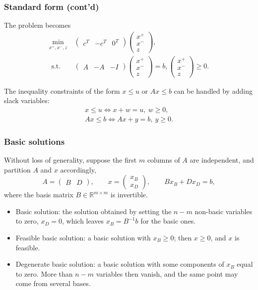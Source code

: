 \documentclass[aspectratio=169]{beamer}
\providecommand{\red}{\color{red}}
\def\RR{\mathbb{R}}
\begin{document}
\begin{frame}
\frametitle{Standard form (cont'd)}

The problem becomes
\begin{align*}
\min_{x^+, x^-, z}\ &
\begin{pmatrix}
c^T & -c^T & 0^T
\end{pmatrix}
\begin{pmatrix}
x^+ \\ x^- \\ z
\end{pmatrix}, \\
\mbox{ s.t. } &
\begin{pmatrix}
A & -A & -I
\end{pmatrix}
\begin{pmatrix}
x^+ \\ x^- \\ z
\end{pmatrix} = b,
\begin{pmatrix}
x^+ \\ x^- \\ z
\end{pmatrix} \geq 0.
\end{align*}

The inequality constraints of the form $x \leq u$ or $Ax \leq b$ can be handled by adding slack variables:
\begin{align*}
x \leq u \Leftrightarrow x+w = u,\ w \geq 0, \\
Ax \leq b \Leftrightarrow Ax + y = b,\ y \geq 0.
\end{align*}

\end{frame}

\begin{frame}
\frametitle{Basic solutions}

Without loss of generality, suppose the first $m$ columns of $A$ are independent, and partition $A$ and $x$ accordingly,
\[
A = \begin{pmatrix} B & D \end{pmatrix}, \qquad x = \begin{pmatrix} x_B \\ x_D \end{pmatrix},
\qquad Bx_B + Dx_D = b,
\]
where the {\red basis matrix} $B \in \RR^{m \times m}$ is invertible.

\begin{itemize}
	\item
	{\red Basic solution}: the solution obtained by setting the $n-m$ {\red non-basic} variables to zero, $x_D = 0$, which leaves $x_B = B^{-1}b$ for the {\red basic} ones.
	\item
	{\red Feasible basic solution}: a basic solution with $x_B \geq 0$; then $x \geq 0$, and $x$ is feasible.
	\item
	{\red Degenerate basic solution}: a basic solution with some components of $x_B$ equal to zero. More than $n-m$ variables then vanish, and the same point may come from several bases.
\end{itemize}

\end{frame}
\end{document}
